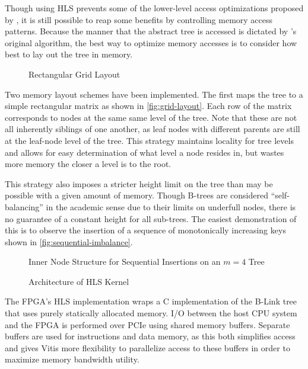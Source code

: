 Though using HLS prevents some of the lower-level access optimizations proposed
by \citeauthor{holzinger-ipdpsw-2021}, it is still possible to reap some
benefits by controlling memory access patterns. Because the manner that the
abstract tree is accessed is dictated by \citeauthor{b-link}'s original
algorithm, the best way to optimize memory accesses is to consider how best to
lay out the tree in memory.

\begin{figure}
	\centering
	
	\caption{Rectangular Grid Layout}
	\label{fig:grid-layout}
\end{figure}

Two memory layout schemes have been implemented. The first maps the tree to a
simple rectangular matrix as shown in \autoref{fig:grid-layout}. Each row of the
matrix corresponds to nodes at the same same level of the tree. Note that these
are not all inherently siblings of one another, as leaf nodes with different
parents are still at the leaf-node level of the tree. This strategy maintains
locality for tree levels and allows for easy determination of what level a node
resides in, but wastes more memory the closer a level is to the root.

This strategy also imposes a stricter height limit on the tree than may be
possible with a given amount of memory. Though B-trees are considered
``self-balancing'' in the academic sense due to their limits on underfull nodes,
there is no guarantee of a constant height for all sub-trees. The easiest
demonstration of this is to observe the insertion of a sequence of monotonically
increasing keys shown in \autoref{fig:sequential-imbalance}.

\begin{figure}
	\centering
	
	\caption{Inner Node Structure for Sequential Insertions on an $m=4$ Tree}
	\label{fig:sequential-imbalance}
\end{figure}



\begin{figure}
	\centering
	
	\caption{Architecture of HLS Kernel}
	\label{fig:hls-arch}
\end{figure}

The FPGA's HLS implementation wraps a C implementation of the B-Link tree that
uses purely statically allocated memory. I/O between the host CPU system and the
FPGA is performed over PCIe using shared memory buffers. Separate buffers are
used for instructions and data memory, as this both simplifies access and gives
Vitis more flexibility to parallelize access to these buffers in order to
maximize memory bandwidth utility.

